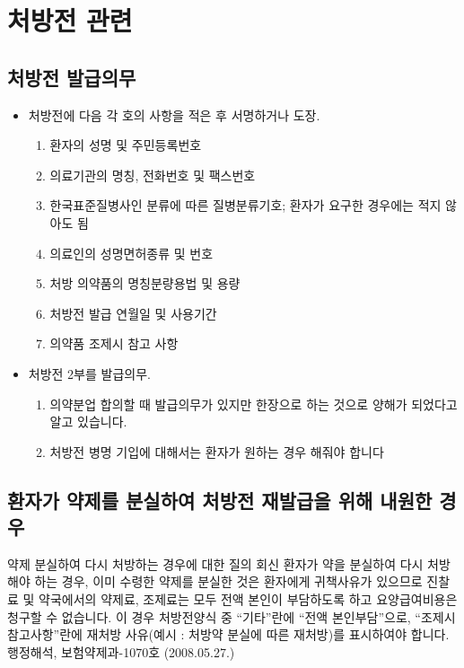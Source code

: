 ﻿\section{처방전 관련}
\subsection{처방전 발급의무}
\begin{itemize}[-]\tightlist
\item 처방전에 다음 각 호의 사항을 적은 후 서명하거나 도장. 
	\begin{enumerate}[1.]\tightlist
	\item 환자의 성명 및 주민등록번호
	\item 의료기관의 명칭, 전화번호 및 팩스번호
	\item 한국표준질병\cntrdot{}사인 분류에 따른 질병분류기호; 환자가 요구한 경우에는 적지 않아도 됨
	\item 의료인의 성명\cntrdot{}면허종류 및 번호
	\item 처방 의약품의 명칭\cntrdot{}분량\cntrdot{}용법 및 용량
	\item 처방전 발급 연월일 및 사용기간
	\item 의약품 조제시 참고 사항
	\end{enumerate}
\item 처방전 2부를 발급의무. 
	\begin{enumerate}[1.]\tightlist
	\item 의약분업 합의할 때 발급의무가 있지만 한장으로 하는 것으로 양해가 되었다고 알고 있습니다.
	\item 처방전 병명 기입에 대해서는 환자가 원하는 경우 해줘야 합니다
	\end{enumerate}
\end{itemize}
	
\subsection{환자가 약제를 분실하여 처방전 재발급을 위해 내원한 경우}

\begin{commentbox}{약제 분실하여 다시 처방하는 경우에 대한 질의 회신}
환자가 약을 분실하여 다시 처방해야 하는 경우, 이미 수령한 약제를 분실한 것은 환자에게 귀책사유가 있으므로 진찰료 및 약국에서의 약제료, 조제료는 모두 전액 본인이 부담하도록 하고 요양급여비용은 청구할 수 없습니다. 이 경우 처방전양식 중 “기타”란에 “전액 본인부담”으로, “조제시 참고사항”란에 재처방 사유(예시 : 처방약 분실에 따른 재처방)를 표시하여야 합니다. 행정해석, 보험약제과-1070호 (2008.05.27.)
\end{commentbox}

